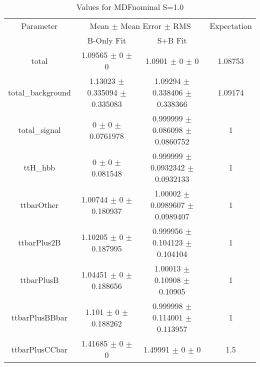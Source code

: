 \begin{table}
\centering
\caption{Values for MDFnominal S=1.0}
\begin{tabular}{cccc}
\toprule
Parameter & \multicolumn{2}{c}{Mean $\pm$ Mean Error $\pm$ RMS} & Expectation\\
 & B-Only Fit & S+B Fit & \\
\midrule
total & \num{1.09565} $\pm$ \num{0} $\pm$ \num{0} & \num{1.0901} $\pm$ \num{0} $\pm$ \num{0} & \num{1.08753}\\
total\_background & \num{1.13023} $\pm$ \num{0.335094} $\pm$ \num{0.335083} & \num{1.09294} $\pm$ \num{0.338406} $\pm$ \num{0.338366} & \num{1.09174}\\
total\_signal & \num{0} $\pm$ \num{0} $\pm$ \num{0.0761978} & \num{0.999999} $\pm$ \num{0.086098} $\pm$ \num{0.0860752} & \num{1}\\
ttH\_hbb & \num{0} $\pm$ \num{0} $\pm$ \num{0.081548} & \num{0.999999} $\pm$ \num{0.0932342} $\pm$ \num{0.0932133} & \num{1}\\
ttbarOther & \num{1.00744} $\pm$ \num{0} $\pm$ \num{0.180937} & \num{1.00002} $\pm$ \num{0.0989607} $\pm$ \num{0.0989407} & \num{1}\\
ttbarPlus2B & \num{1.10205} $\pm$ \num{0} $\pm$ \num{0.187995} & \num{0.999956} $\pm$ \num{0.104123} $\pm$ \num{0.104104} & \num{1}\\
ttbarPlusB & \num{1.04451} $\pm$ \num{0} $\pm$ \num{0.188656} & \num{1.00013} $\pm$ \num{0.10908} $\pm$ \num{0.10905} & \num{1}\\
ttbarPlusBBbar & \num{1.101} $\pm$ \num{0} $\pm$ \num{0.188262} & \num{0.999998} $\pm$ \num{0.114001} $\pm$ \num{0.113957} & \num{1}\\
ttbarPlusCCbar & \num{1.41685} $\pm$ \num{0} $\pm$ \num{0} & \num{1.49991} $\pm$ \num{0} $\pm$ \num{0} & \num{1.5}\\
\bottomrule
\end{tabular}
\end{table}